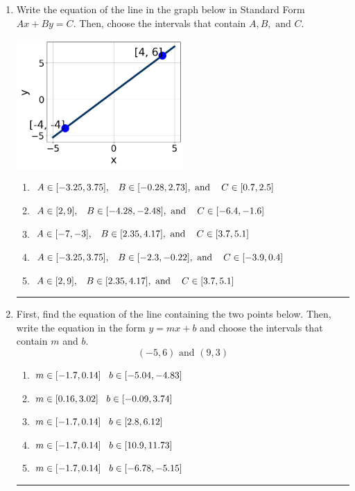 \documentclass[14pt]{extbook}
\newcommand{\litem}[1]{\item#1\hspace*{-1cm}\rule{\textwidth}{0.4pt}}
\begin{document}
\begin{enumerate}
{\begin{enumerate}[label=\Alph*.]
\end{enumerate} }
\litem{
Write the equation of the line in the graph below in Standard Form $Ax+By=C$. Then, choose the intervals that contain $A, B, \text{ and } C$.
\begin{center}
    \includegraphics[width=0.5\textwidth]{../Figures/linearGraphToStandardA.png}
\end{center}
\begin{enumerate}[label=\Alph*.]
\item \( A \in [-3.25, 3.75], \hspace{3mm} B \in [-0.28, 2.73], \text{ and } \hspace{3mm} C \in [0.7, 2.5] \)
\item \( A \in [2, 9], \hspace{3mm} B \in [-4.28, -2.48], \text{ and } \hspace{3mm} C \in [-6.4, -1.6] \)
\item \( A \in [-7, -3], \hspace{3mm} B \in [2.35, 4.17], \text{ and } \hspace{3mm} C \in [3.7, 5.1] \)
\item \( A \in [-3.25, 3.75], \hspace{3mm} B \in [-2.3, -0.22], \text{ and } \hspace{3mm} C \in [-3.9, 0.4] \)
\item \( A \in [2, 9], \hspace{3mm} B \in [2.35, 4.17], \text{ and } \hspace{3mm} C \in [3.7, 5.1] \)

\end{enumerate} }
\litem{
First, find the equation of the line containing the two points below. Then, write the equation in the form $ y=mx+b $ and choose the intervals that contain $m$ and $b$.\[ (-5, 6) \text{ and } (9, 3) \]\begin{enumerate}[label=\Alph*.]
\item \( m \in [-1.7, 0.14] \hspace*{3mm} b \in [-5.04, -4.83] \)
\item \( m \in [0.16, 3.02] \hspace*{3mm} b \in [-0.09, 3.74] \)
\item \( m \in [-1.7, 0.14] \hspace*{3mm} b \in [2.8, 6.12] \)
\item \( m \in [-1.7, 0.14] \hspace*{3mm} b \in [10.9, 11.73] \)
\item \( m \in [-1.7, 0.14] \hspace*{3mm} b \in [-6.78, -5.15] \)


\end{enumerate}}
\end{enumerate}
\end{document}

